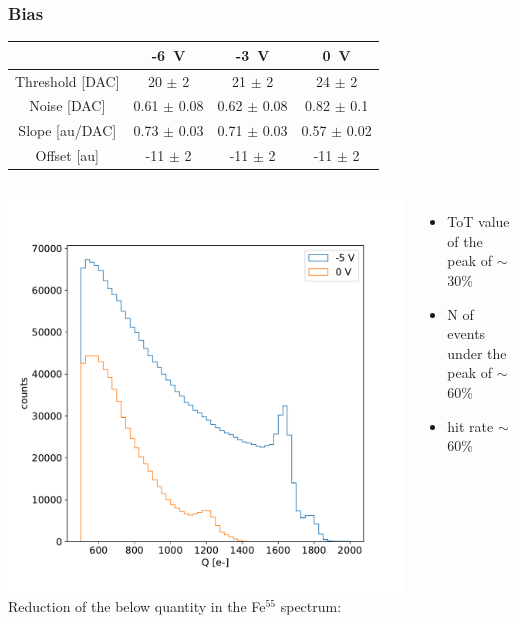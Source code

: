     \begin{frame}
        \frametitle{Bias}
        \begin{table}
            \tiny
            \begin{center}
            \begin{tabular}{| c |  c | c | c |}
            \hline
            & -\SI{6}{V} & -\SI{3}{V} & \SI{0}{V}\\
            \hline
            \hline
            Threshold [DAC] & 20 $\pm$ 2 & 21 $\pm$ 2 & 24 $\pm$ 2\\
            Noise [DAC] & 0.61 $\pm$ 0.08 & 0.62 $\pm$ 0.08 & 0.82 $\pm$ 0.1\\
            Slope [au/DAC] & 0.73 $\pm$ 0.03 & 0.71 $\pm$ 0.03  & 0.57 $\pm$ 0.02\\
            Offset [au] & -11 $\pm$ 2 & -11 $\pm$ 2 & -11 $\pm$ 2 \\
            \hline
            \end{tabular}
            \end{center}
        \end{table} 
        \begin{columns}
            \includegraphics[width=1.2\linewidth]{figures/charaterization/Fe_spectrum_bias.pdf}
            Reduction of the below quantity in the Fe$^{55}$ spectrum: 
            \begin{itemize}
                \item ToT value of the peak of $\sim$30\%
                \item N of events under the peak of $\sim$60\%
                \item hit rate $\sim$60\%
            \end{itemize}
          

\end{columns}
\end{frame}
